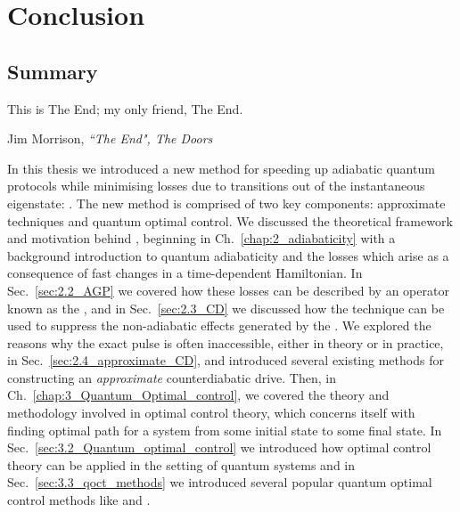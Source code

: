 \part{Conclusion}\label{part:conclusion}

\chapter{Summary}\label{chap:8_Summary}

\epigraph{This is The End; my only friend, The End.}{Jim Morrison,
\emph{``The End", The Doors}}

In this thesis we introduced a new method for speeding up adiabatic quantum protocols while minimising losses due to transitions out of the instantaneous eigenstate: . The new method is comprised of two key components: approximate  techniques and quantum optimal control. We discussed the theoretical framework and motivation behind , beginning in Ch.~\ref{chap:2_adiabaticity} with a background introduction to quantum adiabaticity and the losses which arise as a consequence of fast changes in a time-dependent Hamiltonian. In Sec.~\ref{sec:2.2_AGP} we covered how these losses can be described by an operator known as the  \cite{kolodrubetz_geometry_2017}, and in Sec.~\ref{sec:2.3_CD} we discussed how the  technique can be used to suppress the non-adiabatic effects generated by the  \cite{berry_transitionless_2009, demirplak_adiabatic_2003}. We explored the reasons why the exact  pulse is often inaccessible, either in theory or in practice, in Sec.~\ref{sec:2.4_approximate_CD}, and introduced several existing methods for constructing an \emph{approximate} counterdiabatic drive. Then, in Ch.~\ref{chap:3_Quantum_Optimal_control}, we covered the theory and methodology involved in optimal control theory, which concerns itself with finding optimal path for a system from some initial state to some final state. In Sec.~\ref{sec:3.2_Quantum_optimal_control} we introduced how optimal control theory can be applied in the setting of quantum systems and in Sec.~\ref{sec:3.3_qoct_methods} we introduced several popular quantum optimal control methods like  and . 

